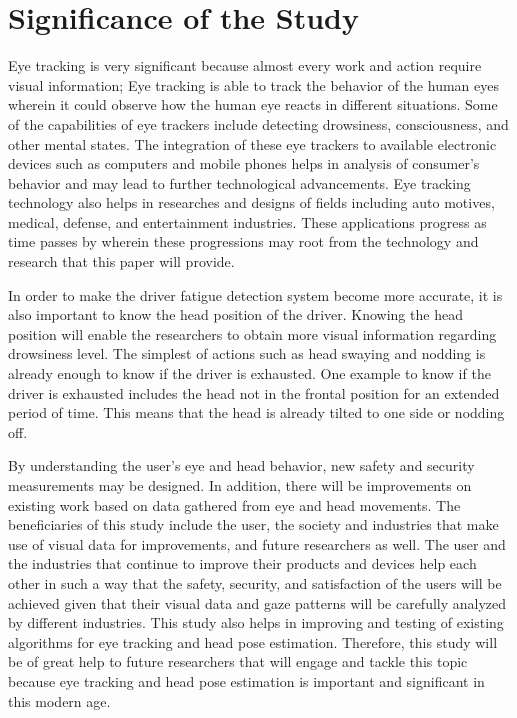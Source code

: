 \section{Significance of the Study}

Eye tracking is very significant because almost every work and action require visual information; Eye tracking is able to track the behavior of the human eyes wherein it could observe how the human eye reacts in different situations. Some of the capabilities of eye trackers include detecting drowsiness, consciousness, and other mental states. The integration of these eye trackers to available electronic devices such as computers and mobile phones helps in analysis of consumer’s behavior and may lead to further technological advancements. Eye tracking technology also helps in researches and designs of fields including auto motives, medical, defense, and entertainment industries. These applications progress as time passes by wherein these progressions may root from the technology and research that this paper will provide.

In order to make the driver fatigue detection system become more accurate, it is also important to know the head position of the driver. Knowing the head position will enable the researchers to obtain more visual information regarding drowsiness level. The simplest of actions such as head swaying and nodding is already enough to know if the driver is exhausted. 
One example to know if the driver is exhausted includes the head not in the frontal position for an extended period of time. This means that the head is already tilted to one side or nodding off.

By understanding the user’s eye and head behavior, new safety and security measurements may be designed. In addition, there will be improvements on existing work based on data gathered from eye and head movements. The beneficiaries of this study include the user, the society and industries that make use of visual data for improvements, and future researchers as well. The user and the industries that continue to improve their products and devices help each other in such a way that the safety, security, and satisfaction of the users will be achieved given that their visual data and gaze patterns will be carefully analyzed by different industries. This study also helps in improving and testing of existing algorithms for eye tracking and head pose estimation. Therefore, this study will be of great help to future researchers that will engage and tackle this topic because eye tracking and head pose estimation is important and significant in this modern age. 




